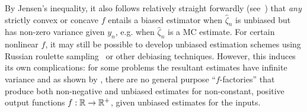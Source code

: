 By Jensen's inequality, it also follows relatively straight forwardly (see~\cite{rainforth2017pitfalls}) 
that \emph{any} strictly convex or concave $f$  entails a biased estimator 
when $\hat{\zeta}_n$ is unbiased but has non-zero variance given $y_n$, e.g.
when $\hat{\zeta}_n$ is a MC estimate.
For certain nonlinear $f$, it may still be possible to develop unbiased estimation
schemes using Russian roulette sampling~\citep{lyne2015russian} or other debiasing techniques.  
However, this induces its own complications: for some problems the resultant estimates
have infinite variance \citep{lyne2015russian} and as shown by \cite{jacob2015nonnegative}, there are 
no general purpose ``$f$-factories'' that produce both non-negative and
unbiased estimates for non-constant, positive output functions $f : \mathbb{R} \rightarrow \mathbb{R}^+$,
given unbiased estimates for the inputs.

